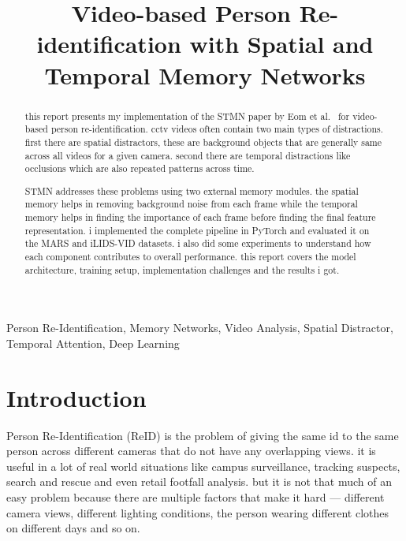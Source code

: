 \documentclass[conference]{IEEEtran}
\begin{document}
\title{Video-based Person Re-identification with Spatial and Temporal Memory Networks}

\author{
}

\maketitle

\begin{abstract}
this report presents my implementation of the STMN paper by Eom et al.~\cite{eom2021stmn} for video-based person re-identification. cctv videos often contain two main types of distractions. first there are spatial distractors, these are background objects that are generally same across all videos for a given camera. second there are temporal distractions like occlusions which are also repeated patterns across time.

STMN addresses these problems using two external memory modules. the spatial memory helps in removing background noise from each frame while the temporal memory helps in finding the importance of each frame before finding the final feature representation. i implemented the complete pipeline in PyTorch and evaluated it on the MARS and iLIDS-VID datasets. i also did some experiments to understand how each component contributes to overall performance. this report covers the model architecture, training setup, implementation challenges and the results i got.
\end{abstract}

\begin{IEEEkeywords}
Person Re-Identification, Memory Networks, Video Analysis, Spatial Distractor, Temporal Attention, Deep Learning
\end{IEEEkeywords}

\section{Introduction}

Person Re-Identification (ReID) is the problem of giving the same id to the same person across different cameras that do not have any overlapping views. it is useful in a lot of real world situations like campus surveillance, tracking suspects, search and rescue and even retail footfall analysis. but it is not that much of an easy problem because there are multiple factors that make it hard --- different camera views, different lighting conditions, the person wearing different clothes on different days and so on.
\end{document}
